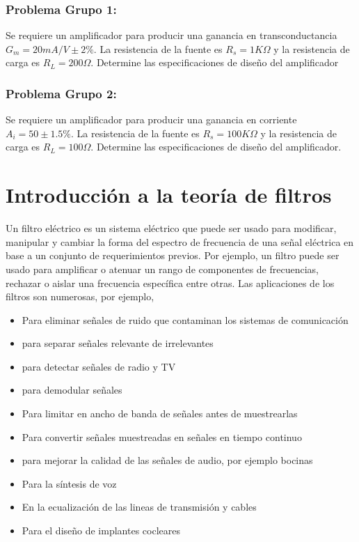 \documentclass[12pt]{book}
\theoremstyle{definition}
\theoremstyle{remark}
\theoremstyle{plain}
\begin{document}
\subsection{Problema Grupo 1:}
Se requiere un amplificador para producir una ganancia en transconductancia $G_m = 20 mA/V \pm 2 \%$. La resistencia de la fuente es $R_s = 1 K \Omega $ y la resistencia de carga es $R_L = 200 \Omega$. Determine las especificaciones de diseño del amplificador

\subsection{Problema Grupo 2:}

Se requiere un amplificador para producir una ganancia en corriente $A_i = 50 \pm 1.5 \%$. La resistencia de la fuente es $R_s = 100 K \Omega$ y la resistencia de carga es $R_L= 100 \Omega$. Determine las especificaciones de diseño del amplificador.

\chapter{Introducción a la teoría de filtros}
Un filtro eléctrico  es un sistema eléctrico que puede ser usado para modificar, manipular y cambiar la forma del espectro de frecuencia de una señal eléctrica en base a un conjunto de requerimientos previos. Por ejemplo, un filtro puede ser usado para amplificar o atenuar un rango de componentes de frecuencias, rechazar o aislar una frecuencia específica entre otras. Las aplicaciones de los filtros son numerosas, por ejemplo,

\begin{itemize}
\item Para eliminar señales de ruido que contaminan los sistemas de comunicación
\item para separar señales relevante de irrelevantes
\item para detectar señales de radio y TV
\item para demodular señales
\item Para limitar en ancho de banda de señales antes de muestrearlas
\item Para convertir señales muestreadas en señales en tiempo continuo
\item para mejorar la calidad de las señales de audio, por ejemplo bocinas
\item Para la síntesis de voz
\item En la ecualización de las lineas de transmisión y cables
\item Para el diseño de implantes cocleares
\end{itemize}
\end{document}
